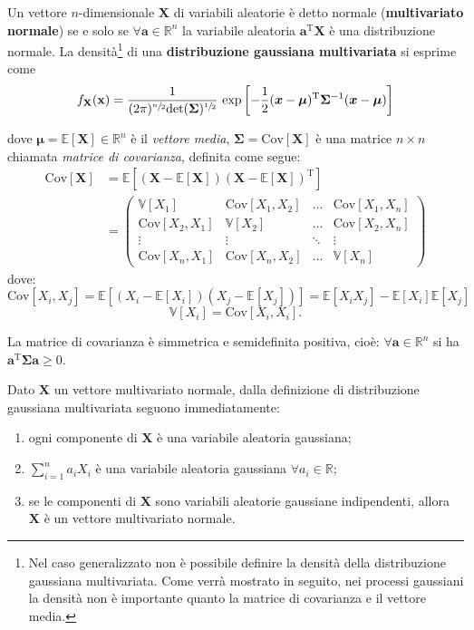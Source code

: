 \begin{defi} Un vettore $n$-dimensionale $\mathbf{X}$ di variabili aleatorie è detto normale (\textbf{multivariato normale}) se e solo se $\forall \mathbf{a}\in \mathbb{R}^n$ la variabile aleatoria $\mathbf{a}^\text{T}\mathbf{X}$ è una distribuzione normale.  
La densità\footnote{Nel caso generalizzato non è possibile definire la densità della distribuzione gaussiana multivariata. Come verrà mostrato in seguito, nei processi gaussiani la densità non è importante quanto la matrice di covarianza e il vettore media.} di una \textbf{distribuzione gaussiana multivariata} si esprime come
\[f_{\mathbf{X}}(\mathbf{x})=\frac{1}{(2\pi)^{\sfrac{n}{2}}  \text{det}(\bm{\Sigma})^{\sfrac{1}{2}}} \text{ exp}\left[-\frac{1}{2}(\bm{x}-\bm{\mu})^\text{T}\bm{\Sigma}^{-1}(\bm{x}-\bm{\mu})\right]
\]\end{defi}
dove $\bm{\mu}=\mathbb{E}[\bm{X}]\in \mathbb{R}^n$ è il \textit{vettore media}, $\bm{\Sigma}=\text{Cov}[\bm{X}]$ è una matrice $n\times n$ chiamata \textit{matrice di covarianza}, definita come segue:
\[\begin{split}
\text{Cov}[\bm{X}] &= \mathbb{E}\left[(\bm{X}-\mathbb{E}[\bm{X}])(\bm{X}-\mathbb{E}[\bm{X}])^\text{T} \right]\\
 & = \begin{pmatrix}
    \mathbb{V}[X_1] & \text{Cov}[X_1,X_2] & \dots & \text{Cov}[X_1,X_n]\\
    \text{Cov}[X_2,X_1] & \mathbb{V}[X_2] & \dots & \text{Cov}[X_2,X_n]\\
    \vdots & \vdots & \ddots & \vdots\\
    \text{Cov}[X_n,X_1] & \text{Cov}[X_n,X_2] & \dots & \mathbb{V}[X_n]
    \end{pmatrix}
\end{split}
\]
dove:
\[ \text{Cov}[X_i,X_j]=\mathbb{E}[(X_i-\mathbb{E}[X_i])(X_j-\mathbb{E}[X_j])] = \mathbb{E}[X_iX_j]-\mathbb{E}[X_i]\mathbb{E}[X_j]  \]
\[ \mathbb{V}[X_i]=\text{Cov}[X_i, X_i]. \]


\begin{oss}\label{ossGaussianaMultivariata}
La matrice di covarianza è simmetrica e semidefinita positiva, cioè: $\forall \mathbf{a}\in \mathbb{R}^n$ si ha $\mathbf{a}^\text{T}\mathbf{\Sigma} \mathbf{a}\geq 0$.
\end{oss}


\begin{cor}
Dato $\mathbf{X}$ un vettore multivariato normale, dalla definizione di distribuzione gaussiana multivariata seguono immediatamente:
\begin{enumerate}
    \item ogni componente di $\mathbf{X}$ è una variabile aleatoria gaussiana;
    \item $\sum_{i=1}^{n} a_iX_i$ è una variabile aleatoria gaussiana $\forall a_i\in \mathbb{R}$;
    \item se le componenti di $\mathbf{X}$ sono variabili aleatorie gaussiane indipendenti, allora $\mathbf{X}$ è un vettore multivariato normale.
\end{enumerate}
\end{cor}

